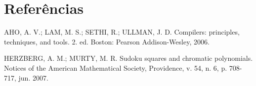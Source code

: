 \documentclass{article}
\begin{document}
\section{Referências}

AHO, A. V.; LAM, M. S.; SETHI, R.; ULLMAN, J. D. Compilers: principles, techniques, and tools. 2. ed. Boston: Pearson Addison-Wesley, 2006.

\noindent HERZBERG, A. M.; MURTY, M. R. Sudoku squares and chromatic polynomials. Notices of the American Mathematical Society, Providence, v. 54, n. 6, p. 708-717, jun. 2007.
\end{document}
